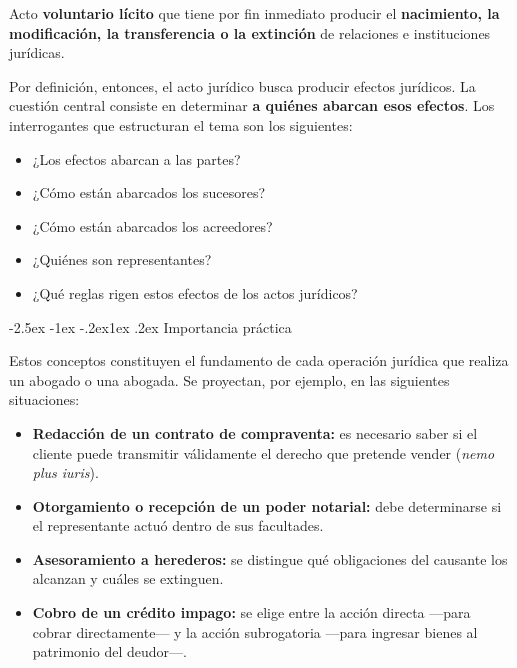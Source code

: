 \documentclass[12pt,oneside]{book}
\makeatletter
\renewcommand\subsection{\@startsection{subsection}{2}{\z@}%
  {-2.5ex \@plus -1ex \@minus -.2ex}{1ex \@plus .2ex}%
  {\normalfont\normalsize\bfseries}}
\makeatother
\begin{document}
\begin{definicion}
Acto \textbf{voluntario lícito} que tiene por fin inmediato producir el \textbf{nacimiento, la modificación, la transferencia o la extinción} de relaciones e instituciones jurídicas.
\end{definicion}

Por definición, entonces, el acto jurídico busca producir efectos jurídicos. La cuestión central consiste en determinar \textbf{a quiénes abarcan esos efectos}. Los interrogantes que estructuran el tema son los siguientes:

\begin{itemize}
    \item ¿Los efectos abarcan a las partes?
    \item ¿Cómo están abarcados los sucesores?
    \item ¿Cómo están abarcados los acreedores?
    \item ¿Quiénes son representantes?
    \item ¿Qué reglas rigen estos efectos de los actos jurídicos?
\end{itemize}

\subsection{Importancia práctica}

Estos conceptos constituyen el fundamento de cada operación jurídica que realiza un abogado o una abogada. Se proyectan, por ejemplo, en las siguientes situaciones:

\begin{itemize}
    \item \textbf{Redacción de un contrato de compraventa:} es necesario saber si el cliente puede transmitir válidamente el derecho que pretende vender (\textit{nemo plus iuris}).
    \item \textbf{Otorgamiento o recepción de un poder notarial:} debe determinarse si el representante actuó dentro de sus facultades.
    \item \textbf{Asesoramiento a herederos:} se distingue qué obligaciones del causante los alcanzan y cuáles se extinguen.
    \item \textbf{Cobro de un crédito impago:} se elige entre la acción directa ---para cobrar directamente--- y la acción subrogatoria ---para ingresar bienes al patrimonio del deudor---.
\end{itemize}
\end{document}
